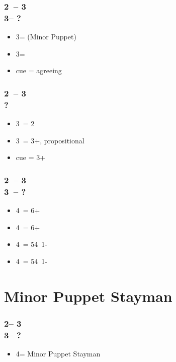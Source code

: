 \documentclass[12pt, a4paper]{report}
\begin{document}
{{        \subsubsection*{2\ntx\ -- 3\diams \\
                        3\hearts -- ?}
        \begin{itemize}
            \item 3\spades = \nt (\then Minor Puppet)
            \item 3\nt = \spades \nat
            \item cue = agreeing \hearts
        \end{itemize}

        \subsubsection*{2\ntx\ -- 3\hearts \\ ?}
        \begin{itemize}
            \item 3\spades\ = 2\spades
            \item 3\nt\ = 3+\spades, propositional
            \item cue = 3+\spades
        \end{itemize}

        \subsubsection*{2\ntx\ -- 3\spades \\ 3\nt\ -- ?}
        \begin{itemize}
            \item 4\clubs\ = 6+\clubs
            \item 4\diams\ = 6+\diams
            \item 4\hearts\ = 54\minor\ 1-\hearts
            \item 4\spades\ = 54\minor\ 1-\spades
        \end{itemize}
    

        \section*{\colorbox{blue!30}{Minor Puppet Stayman}}
         {
            \subsubsection*{2\nt -- 3\clubs\\
                        3\diams -- ?}
            \begin{itemize}
                \item 4\clubs = Minor Puppet Stayman
            \end{itemize}

}}}
\end{document}

